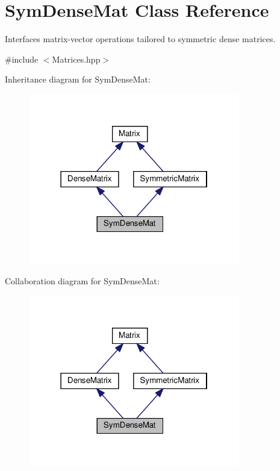 \hypertarget{class_sym_dense_mat}{}\section{Sym\+Dense\+Mat Class Reference}
\label{class_sym_dense_mat}


Interfaces matrix-\/vector operations tailored to symmetric dense matrices.  




{\ttfamily \#include $<$Matrices.\+hpp$>$}



Inheritance diagram for Sym\+Dense\+Mat\+:
\nopagebreak
\begin{figure}[H]
\begin{center}
\leavevmode
\includegraphics[width=262pt]{class_sym_dense_mat__inherit__graph}
\end{center}
\end{figure}


Collaboration diagram for Sym\+Dense\+Mat\+:
\nopagebreak
\begin{figure}[H]
\begin{center}
\leavevmode
\includegraphics[width=262pt]{class_sym_dense_mat__coll__graph}
\end{center}
\end{figure}
